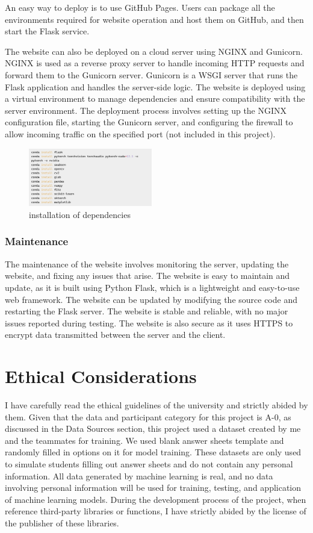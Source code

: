 \documentclass[twocolumn]{article}
\begin{document}
An easy way to deploy is to use GitHub Pages. Users can package all the environments required for website operation and host them on GitHub, and then start the Flask service.

The website can also be deployed on a cloud server using NGINX and Gunicorn. NGINX is used as a reverse proxy server to handle incoming HTTP requests and forward them to the Gunicorn server. Gunicorn is a WSGI server that runs the Flask application and handles the server-side logic. The website is deployed using a virtual environment to manage dependencies and ensure compatibility with the server environment. The deployment process involves setting up the NGINX configuration file, starting the Gunicorn server, and configuring the firewall to allow incoming traffic on the specified port (not included in this project).

\begin{figure}[ht]
    \centering
    \includegraphics[width=0.48\textwidth]{dependencies.png}
    \caption{installation of dependencies}
    \label{fig:dependencies}
\end{figure}

\subsubsection{Maintenance}
The maintenance of the website involves monitoring the server, updating the website, and fixing any issues that arise. The website is easy to maintain and update, as it is built using Python Flask, which is a lightweight and easy-to-use web framework. The website can be updated by modifying the source code and restarting the Flask server. The website is stable and reliable, with no major issues reported during testing. The website is also secure as it uses HTTPS to encrypt data transmitted between the server and the client. 

\section{Ethical Considerations}
I have carefully read the ethical guidelines\cite{ethic} of the university and strictly abided by them. Given that the data and participant category for this project is A-0, as discussed in the Data Sources section, this project used a dataset created by me and the teammates for training. We used blank answer sheets template and randomly filled in options on it for model training. These datasets are only used to simulate students filling out answer sheets and do not contain any personal information. All data generated by machine learning is real, and no data involving personal information will be used for training, testing, and application of machine learning models. During the development process of the project, when reference third-party libraries or functions, I have strictly abided by the license of the publisher of these libraries.
\end{document}
